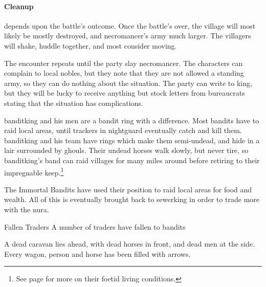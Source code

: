 \begin{multicols}{2}
\paragraph{Cleanup} depends upon the battle's outcome.
Once the battle's over, the village will most likely be mostly destroyed, and \gls{necromancer}'s army much larger.  The villagers will shake, huddle together, and most consider moving.

The encounter repeats until the party slay \gls{necromancer}.
The characters can complain to local nobles, but they note that they are not allowed a standing army, so they can do nothing about the situation.
The party can write to \gls{king}, but they will be lucky to receive anything but stock letters from bureaucrats stating that the situation has complications.


\resumecontents[Town]

\stopcontents[sq]

\label{immortalbandits}

\stopcontents[Town]

\startcontents[sq]

\sqminitoc

\noindent
\Gls{banditking} and his men are a bandit ring with a difference.
Most bandits have to raid local areas, until trackers in \gls{nightguard} eventually catch and kill them.
\Gls{banditking} and his team have rings which make them semi-undead, and hide in a lair surrounded by ghouls.
Their undead horses walk slowly, but never tire, so \gls{banditking}'s band can raid villages for many miles around before retiring to their impregnable keep.\footnote{See page \pageref{necromancers_lair} for more on their foetid living conditions.}

The Immortal Bandits have used their position to raid local areas for food and wealth.
All of this is eventually brought back to \gls{sewerking} in order to trade more with the nura.

{Fallen Traders}%
{A number of traders have fallen to bandits}%

\begin{boxtext}

	A dead caravan lies ahead, with dead horses in front, and dead men at the side.  Every wagon, person and horse has been filled with arrows.

\end{boxtext}


\end{multicols}
